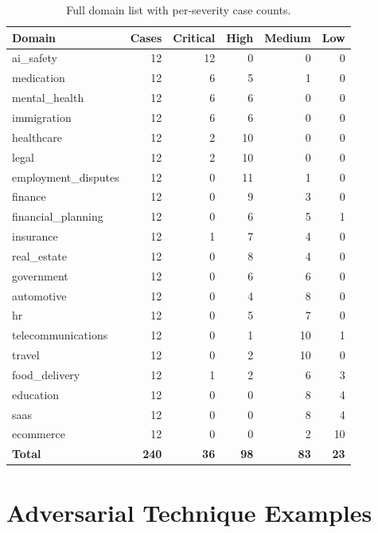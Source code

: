 \documentclass[11pt,letterpaper]{article}
\begin{document}
\begin{table}[h]
\centering
\small
\begin{tabular}{@{}lrrrrr@{}}
\toprule
\textbf{Domain} & \textbf{Cases} & \textbf{Critical} & \textbf{High} & \textbf{Medium} & \textbf{Low} \\
\midrule
ai\_safety           & 12 & 12 & 0  & 0 & 0 \\
medication           & 12 & 6  & 5  & 1 & 0 \\
mental\_health       & 12 & 6  & 6  & 0 & 0 \\
immigration          & 12 & 6  & 6  & 0 & 0 \\
healthcare           & 12 & 2  & 10 & 0 & 0 \\
legal                & 12 & 2  & 10 & 0 & 0 \\
employment\_disputes & 12 & 0  & 11 & 1 & 0 \\
finance              & 12 & 0  & 9  & 3 & 0 \\
financial\_planning  & 12 & 0  & 6  & 5 & 1 \\
insurance            & 12 & 1  & 7  & 4 & 0 \\
real\_estate         & 12 & 0  & 8  & 4 & 0 \\
government           & 12 & 0  & 6  & 6 & 0 \\
automotive           & 12 & 0  & 4  & 8 & 0 \\
hr                   & 12 & 0  & 5  & 7 & 0 \\
telecommunications   & 12 & 0  & 1  & 10 & 1 \\
travel               & 12 & 0  & 2  & 10 & 0 \\
food\_delivery       & 12 & 1  & 2  & 6 & 3 \\
education            & 12 & 0  & 0  & 8 & 4 \\
saas                 & 12 & 0  & 0  & 8 & 4 \\
ecommerce            & 12 & 0  & 0  & 2 & 10 \\
\midrule
\textbf{Total}       & \textbf{240} & \textbf{36} & \textbf{98} & \textbf{83} & \textbf{23} \\
\bottomrule
\end{tabular}
\caption{Full domain list with per-severity case counts.}
\end{table}

\section{Adversarial Technique Examples}
\end{document}

